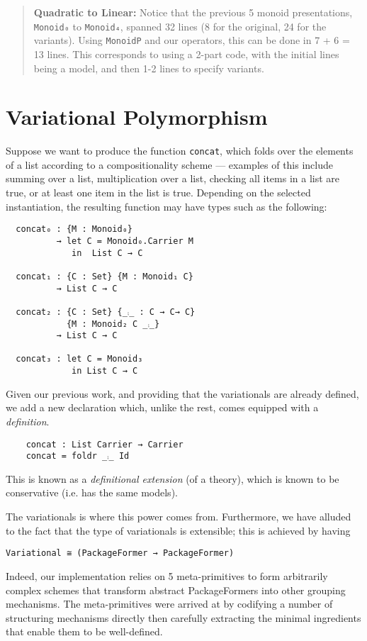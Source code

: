 \documentclass[sigplan,screen]{acmart}
\begin{document}
\begin{quote}
\textbf{Quadratic to Linear:}
Notice that the previous 5 monoid presentations, \texttt{Monoid₀} to \texttt{Monoid₄}, spanned 32
lines (8 for the original, 24 for the variants). Using \texttt{MonoidP} and our operators,
this can be done in 7 + 6 = 13 lines.  This corresponds to using a 2-part code,
with the initial lines being a model, and then 1-2 lines to specify variants.
\end{quote}

\section{\textsf{\upshape Variational} Polymorphism}
\label{sec:org41e7204}
Suppose we want to produce the function \texttt{concat}, which folds over the elements of a list
according to a compositionality scheme --- examples of this include summing over
a list, multiplication over a list, checking all items in a list are true, or
at least one item in the list is true.
Depending on the selected instantiation,
the resulting function may have types such as the following:

\begin{verbatim}
  concat₀ : {M : Monoid₀}
          → let C = Monoid₀.Carrier M
             in  List C → C

  concat₁ : {C : Set} {M : Monoid₁ C}
          → List C → C

  concat₂ : {C : Set} {_⨾_ : C → C→ C}
            {M : Monoid₂ C _⨾_}
          → List C → C

  concat₃ : let C = Monoid₃
             in List C → C
\end{verbatim}

\noindent
Given our previous work, and providing that the variationals are already
defined, we add a new declaration which, unlike the rest, comes
equipped with a \emph{definition}.
\vspace{0.3em}
\begin{verbatim}
    concat : List Carrier → Carrier
    concat = foldr _⨾_ Id
\end{verbatim}
\noindent
This is known as a \emph{definitional extension} (of a theory), which
is known to be conservative (i.e. has the same models).

The variationals is where this power comes from.  Furthermore, we have alluded to
the fact that the type of variationals
is extensible; this is achieved by having
\begin{center}
\texttt{Variational ≅ (PackageFormer → PackageFormer)}
\end{center}
\noindent
Indeed, our implementation relies on 5 meta-primitives to form arbitrarily
complex schemes that transform abstract PackageFormers into
other grouping mechanisms. The meta-primitives were arrived at by codifying
a number of structuring mechanisms directly then carefully extracting the minimal
ingredients that enable them to be well-defined.
\end{document}
